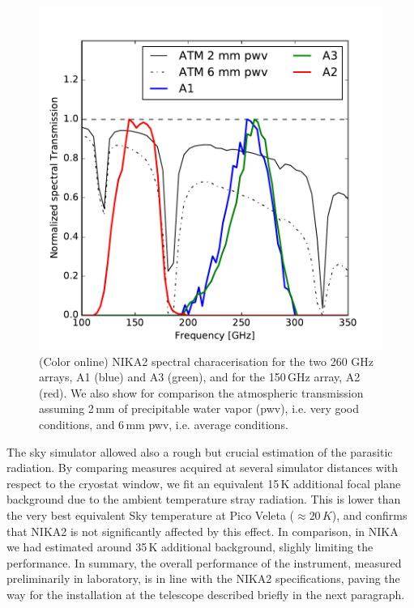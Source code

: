 \documentclass[]{aa} %
\begin{document}
\begin{figure}[h]
   \centering
    \includegraphics[width=1.0\linewidth]{atm_transmission.pdf}
      \caption{(Color online) NIKA2 spectral characerisation for the two 260 GHz arrays, A1 (blue) and A3 (green), and for the 150\,GHz array, A2 (red). We also show for comparison the atmospheric transmission assuming 2\,mm of precipitable water vapor (pwv), i.e. very good conditions, and 6\,mm pwv, i.e. average conditions.
         \label{Fig4}}
\end{figure}

The sky simulator allowed also a rough but crucial estimation of the parasitic radiation. By comparing measures acquired at several simulator distances with respect to the cryostat window, we fit an equivalent 15\,K additional focal plane background due to the ambient temperature stray radiation. This is lower than the very best equivalent Sky temperature at Pico Veleta ($\approx 20\,K$), and confirms that NIKA2 is not significantly affected by this effect. In comparison, in NIKA we had estimated around 35\,K additional background, slighly limiting the performance. 
In summary, the overall performance of the instrument, measured preliminarily in laboratory, is in line with the NIKA2 specifications, paving the way for the installation at the telescope described briefly in the next paragraph. 
\end{document}
